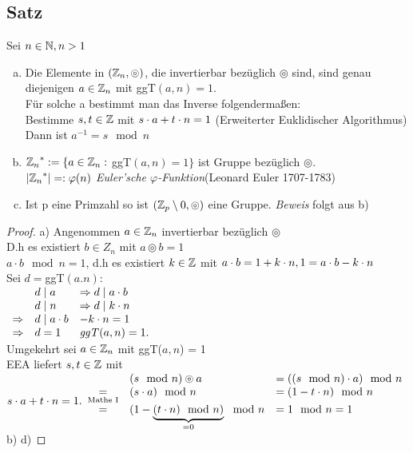 \subsection{Satz}\label{sec:1.7}
Sei $n \in \mathbb{N}, n > 1 $
\begin{enumerate}[a)]
\item Die Elemente in $(\mathbb{Z}_n, \circledcirc)$, die invertierbar bezüglich $\circledcirc$ sind, sind genau diejenigen $a \in \mathbb{Z}_n$ mit ggT$(a,n) = 1$.\\
Für solche a bestimmt man das Inverse folgenderma\ss en:\\
Bestimme $s,t \in \mathbb{Z}$ mit $s \cdot a + t \cdot n =1$ \hfill(Erweiterter Euklidischer Algorithmus)\\
Dann ist $a^{-1} = s \mod n$
\item ${\mathbb{Z}_n}^* := \{a \in \mathbb{Z}_n :$ ggT$(a,n)=1 \}$ ist Gruppe bezüglich $\circledcirc$.\\
$\lvert {\mathbb{Z}_n}^* \rvert=: \varphi(n)$ \qquad\emph{Euler'sche $\varphi$-Funktion}\hfill(Leonard Euler 1707-1783)
\item Ist p eine Primzahl so ist $(\mathbb{Z}_p \setminus {0}, \circledcirc)$ eine Gruppe. \emph{Beweis} folgt aus b)
\end{enumerate}
\begin{proof}
a) Angenommen $a \in \mathbb{Z}_n$ invertierbar bezüglich $\circledcirc$\\
D.h es existiert $b \in Z_n$ mit $a \circledcirc b =1$\\
$a \cdot b \mod n = 1$, d.h es existiert $k \in \mathbb{Z}$ mit $a \cdot b = 1 + k \cdot n, 1 = a \cdot b - k \cdot n$\\
Sei $d =$ggT$(a.n)$:\\$
\begin{array}{lll}
&d \mid a &\Rightarrow d \mid a \cdot b\\
&d \mid n &\Rightarrow d \mid k \cdot n\\
\Rightarrow& d \mid a \cdot b &- k \cdot n = 1\\
\Rightarrow& d =1 & \mathit{ggT}(a,n) = 1.
\end{array}$\\
Umgekehrt sei $a \in \mathbb{Z}_n$ mit ggT($a,n$) = 1\\
EEA liefert $s,t \in \mathbb{Z}$ mit $s \cdot a + t \cdot n = 1.\\
\begin{array}{cll}
& (s \mod n) \circledcirc a &= ((s \mod n)\cdot a) \mod n\\
\underset{\text{Mathe I}}{=}&(s \cdot a)\mod n &= (1-t \cdot n) \mod n\\
=& (1 - \underbrace{(t \cdot n)\mod n)}_{=0} \mod n &= 1 \mod n = 1
\end{array}\\
$b)  d)
\end{proof}
